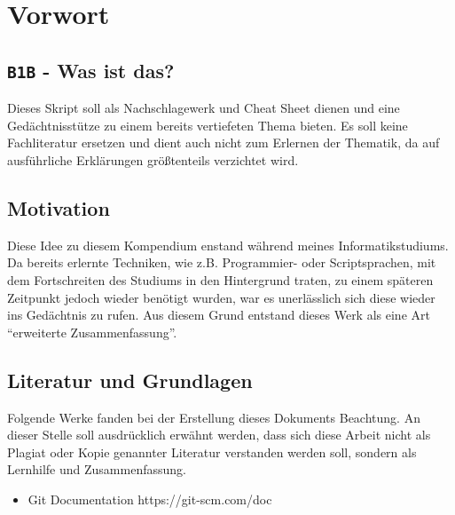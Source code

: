 \chapter{Vorwort}
\section{\texttt{B1B} - Was ist das?}
Dieses Skript soll als Nachschlagewerk und Cheat Sheet dienen und eine Gedächtnisstütze zu einem bereits vertiefeten Thema bieten. Es soll keine Fachliteratur ersetzen und dient auch nicht zum Erlernen der Thematik, da auf ausführliche Erklärungen größtenteils verzichtet wird.
\section{Motivation}
Diese Idee zu diesem Kompendium enstand während meines Informatikstudiums. Da bereits erlernte Techniken, wie z.B. Programmier- oder Scriptsprachen, mit dem Fortschreiten des Studiums in den Hintergrund traten, zu einem späteren Zeitpunkt jedoch wieder benötigt wurden, war es unerlässlich sich diese wieder ins Gedächtnis zu rufen. Aus diesem Grund entstand dieses Werk als eine Art ``erweiterte Zusammenfassung''.
\section{Literatur und Grundlagen}
Folgende Werke fanden bei der Erstellung dieses Dokuments Beachtung. An dieser Stelle soll ausdrücklich erwähnt werden, dass sich diese Arbeit nicht als Plagiat oder Kopie genannter Literatur verstanden werden soll, sondern als Lernhilfe und Zusammenfassung.
\begin{itemize}
\item Git Documentation https://git-scm.com/doc
\end{itemize}
